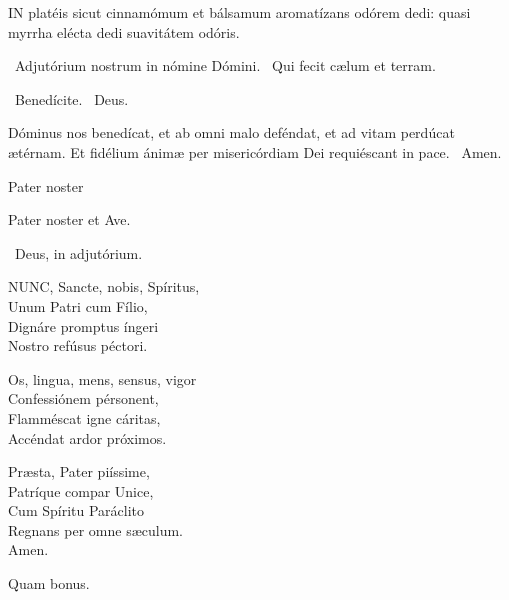 
\lettrine[lines=2]{I}{N} platéis sicut cinnamómum et bálsamum aromatízans odórem dedi: quasi myrrha elécta dedi suavitátem odóris.

\V\ Adjutórium nostrum in nómine Dómini. \R\ Qui fecit cælum et terram.

\V\ Benedícite. \R\ Deus.

 Dóminus nos benedícat, et ab omni malo deféndat, et ad vitam perdúcat ætérnam. Et fidélium ánimæ per misericórdiam Dei requiéscant in pace. \R\ Amen.

 Pater noster 


Pater noster et Ave.

\V\ Deus, in adjutórium.


\lettrine[lines=2]{N}{UNC}, Sancte, nobis, Spíritus,\\
Unum Patri cum Fílio,\\
Dignáre promptus íngeri\\
Nostro refúsus péctori.

Os, lingua, mens, sensus, vigor\\
Confessiónem pérsonent,\\
Flamméscat igne cáritas,\\
Accéndat ardor próximos.

Præsta, Pater piíssime,\\
Patríque compar Unice,\\
Cum Spíritu Paráclito\\
Regnans per omne sæculum.\\
Amen.

 Quam bonus. \textdagger

